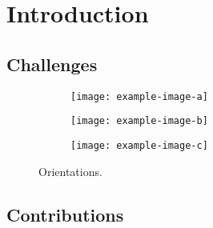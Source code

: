 \chapter{Introduction}
\lipsum[1-2]

\section{Challenges}\label{section:challanges}
\lipsum[1-2]
\begin{figure}[ht!]
	\centering
	\begin{subfigure}[ht!]{0.32\linewidth}
		\centering\texttt{[image: example-image-a]}
		\caption{\label{figure:parallel-orientation}}
	\end{subfigure}%
	\hfill
	\begin{subfigure}[ht!]{0.32\linewidth}
		\centering\texttt{[image: example-image-b]}
		\caption{\label{figure:oblique-orientation}}
	\end{subfigure}%
	\hfill
	\begin{subfigure}[ht!]{0.32\linewidth}
		\centering\texttt{[image: example-image-c]}
		\caption{\label{figure:perpendicular-orientation}}
	\end{subfigure}
	\caption{Orientations.}
\end{figure}

\section{Contributions}
\lipsum[1-2]
